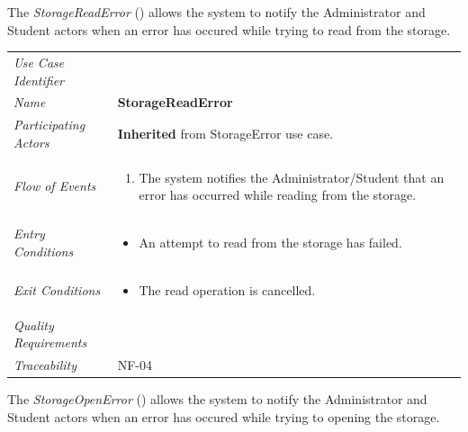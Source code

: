 \documentclass[12pt,letterpaper]{article}
\begin{document}
The {\it StorageReadError} ({\bf \storagereaderror{}}) allows the system to notify the Administrator and Student actors when an error has occured while trying to read from the storage.

\begin{center}
	\begin{tabu} to 
		\toprule
		Use Case Identifier & \storagereaderror{} \\
		Name & {\bf StorageReadError} \\
		Participating Actors & \textbf{Inherited} from StorageError use case. \\
		Flow of Events & 
		\begin{minipage}[t]{\linewidth}
		    \begin{enumerate}
			    \item The system notifies the Administrator/Student that an error has occurred while reading from the storage.
			\end{enumerate}
		\end{minipage} \\

		Entry Conditions &
		\begin{minipage}[t]{\linewidth}
			\begin{itemize}
			    \item An attempt to read from the storage has failed.
	        \end{itemize}
		\end{minipage} \\

		Exit Conditions &
		\begin{minipage}[t]{\linewidth}
			\begin{itemize}
			    \item The read operation is cancelled.
	        \end{itemize}
		\end{minipage} \\

		Quality Requirements & \\

		Traceability & NF-04 \\
		\toprule
	\end{tabu}
\end{center}

\vspace{1em}
The {\it StorageOpenError} ({\bf \storageopenerror{}}) allows the system to notify the Administrator and Student actors when an error has occured while trying to opening the storage.
\end{document}
